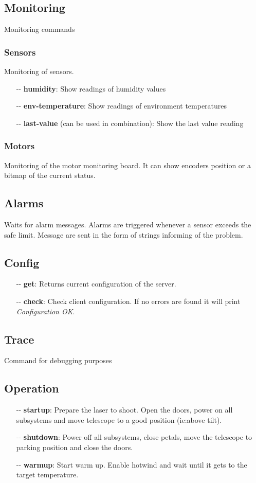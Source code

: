 \documentclass[letterpaper, 10 pt]{article}
\begin{document}
\subsection{Monitoring}
Monitoring commands
\subsubsection{Sensors}
Monitoring of sensors. 
\begin{itemize}
	\item[-{}-] \textbf{humidity}: Show readings of humidity values 
	\item[-{}-] \textbf{env-temperature}: Show readings of environment temperatures
	\item[-{}-] \textbf{last-value} (can be used in combination): Show the last value reading
\end{itemize}
\subsubsection{Motors}
Monitoring of the motor monitoring board. It can show encoders position or a bitmap of the current status.

\subsection{Alarms}
Waits for alarm messages. Alarms are triggered whenever a sensor exceeds the safe limit. Message are sent in the form of strings informing of the problem.

\subsection{Config}
\begin{itemize}
	\item[-{}-] \textbf{get}: Returns current configuration of the server.
	\item[-{}-] \textbf{check}: Check client configuration. If no errors are found it will print \emph{Configuration OK}.
\end{itemize}

\subsection{Trace}
Command for debugging purposes

\subsection{Operation} \label{operationcmds}
\begin{itemize}
	\item[-{}-] \textbf{startup}: Prepare the laser to shoot. Open the doors, power on all subsystems and move telescope to a good position (ie:above tilt).
	\item[-{}-] \textbf{shutdown}: Power off all subsystems, close petals, move the telescope to parking position and close the doors.
	\item[-{}-] \textbf{warmup}: Start warm up. Enable hotwind and wait until it gets to the target temperature.
\end{itemize}
\end{document}
